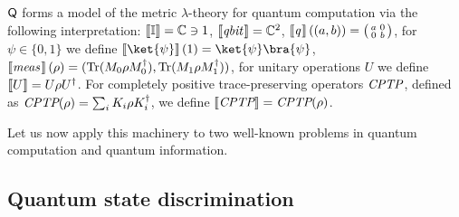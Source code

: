 $\mathsf{Q}$ forms a model of the metric $\lambda$-theory for quantum computation via the following interpretation: $\left \llbracket \mathbb{I} \right \rrbracket= \mathbb{C} \ni  1$, 
$\left \llbracket \emph{qbit} \hspace{1pt} \right \rrbracket= \mathbb{C}^2$, 
$\left \llbracket \emph{q} \hspace{1pt} \right \rrbracket((a,b)) = \big(\begin{smallmatrix}
  a & 0\\
  0 & b
\end{smallmatrix}\big)$, 
for $\psi \in \{0, 1\}$ we define $\sem{\ket{\psi}} (1)= \ket{\psi} \bra{\psi}$,
$\left \llbracket \emph{meas} \hspace{1pt} \right \rrbracket (\rho)= (\text{Tr} (M_{0} \rho M_{0}^{\dag}), \text{Tr} (M_{1} \rho M_{1}^{\dag}))$, 
for unitary operations $U$ we define $\left \llbracket U \right \rrbracket= U \rho U^{\dag}$. 
For completely positive trace-preserving operators $\emph{CPTP}$, defined as $\emph{CPTP} (\rho) = \sum_i K_i \rho K_i^{\dag}$, we define  $\left \llbracket \emph{CPTP} \right \rrbracket = \emph{CPTP}(\rho)$.

Let us now apply this machinery to two well-known problems in quantum computation
and quantum information.

\subsection{Quantum state discrimination}


